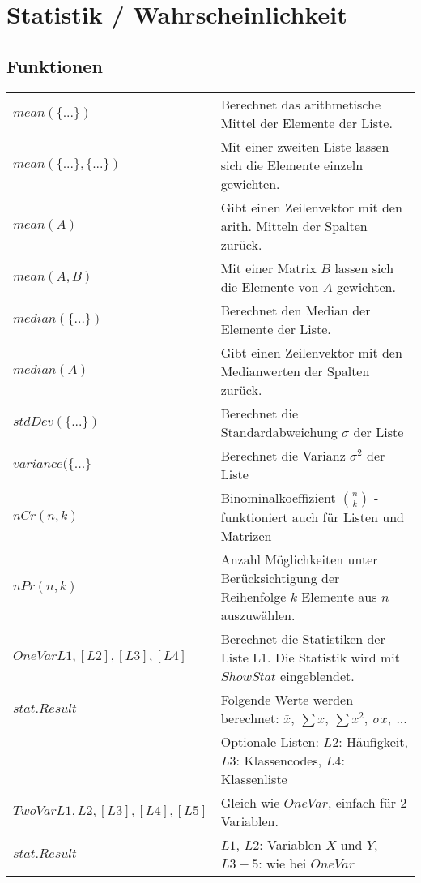 \section{Statistik / Wahrscheinlichkeit}

\subsection{Funktionen}
\begin{tabular}{|l|l|}
	\hline
	$mean(\{...\})$				& Berechnet das arithmetische Mittel der Elemente der Liste. \\
	$mean(\{...\},\{...\})$		& Mit einer zweiten Liste lassen sich die Elemente einzeln gewichten. \\ \hline
	$mean(A)$					& Gibt einen Zeilenvektor mit den arith. Mitteln der Spalten zurück. \\ 
	$mean(A,B)$					& Mit einer Matrix $B$ lassen sich die Elemente von $A$ gewichten. \\ \hline
	$median(\{...\})$			& Berechnet den Median der Elemente der Liste. \\
	$median(A)$					& Gibt einen Zeilenvektor mit den Medianwerten der Spalten zurück. \\ \hline
	$stdDev(\{...\})$			& Berechnet die Standardabweichung $\sigma$ der Liste \\ \hline
	$variance(\{...\}$			& Berechnet die Varianz $\sigma ^2$ der Liste \\ \hline
	$nCr(n,k)$					& Binominalkoeffizient $\binom{n}{k}$ - funktioniert auch für Listen und Matrizen	\\ \hline
	$nPr(n,k)$					& Anzahl Möglichkeiten unter Berücksichtigung der Reihenfolge $k$ Elemente aus $n$ auszuwählen. \\ \hline
	$OneVar L1,[L2],[L3],[L4]$	& Berechnet die Statistiken der Liste L1. Die Statistik wird mit $ShowStat$ eingeblendet. \\
	$stat.Result$					& Folgende Werte werden berechnet: $ \bar x, \: \sum x, \: \sum x^2, \: \sigma x, \: ...$ \\
								& Optionale Listen: $L2$: Häufigkeit, $L3$: Klassencodes, $L4$: Klassenliste \\ \hline
	$TwoVar L1,L2,[L3],[L4],[L5]$ & Gleich wie $OneVar$, einfach für 2 Variablen. \\
	$stat.Result$ & $L1$, $L2$: Variablen $X$ und $Y$, $L3-5$: wie bei $OneVar$ \\ \hline
\end{tabular}

